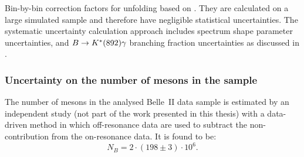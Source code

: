 \begin{table}[hbtp!]
    \centering
    \caption{\label{tab:unfolding_uncertainties} Bin-by-bin correction factors for unfolding based on . 
    They are calculated on a large simulated sample and therefore have negligible statistical uncertainties.
    The systematic uncertainty calculation approach includes \EB spectrum shape parameter uncertainties, 
    \BtoXsgamma and $B\rightarrow K^*(892)\gamma$ branching fraction uncertainties as discussed in  .
    }
    
\end{table}

\subsubsection{Uncertainty on the number of \texorpdfstring{\B}{B} mesons in the sample}\label{sec:b_meson_uncertainty}

The number of \B mesons in the analysed Belle~II data sample is estimated by an independent study (not part of the work presented in this thesis)
with a data-driven method in which off-resonance data are used to subtract the non-\BB contribution from the on-resonance data.
It is found to be:
\begin{equation}\label{eq:b_meson_count}
    N_B = 2\cdot(198\pm3)\cdot10^6.
\end{equation}
